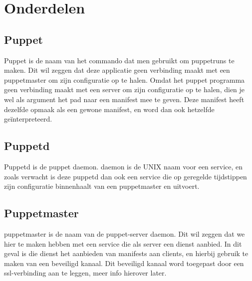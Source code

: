 \section{Onderdelen}

\subsection{Puppet}
Puppet is de naam van het commando dat men gebruikt om puppetruns te maken. Dit wil zeggen dat deze applicatie geen verbinding maakt met een puppetmaster om zijn configuratie op te halen. Omdat het puppet programma geen verbinding maakt met een server om zijn configuratie op te halen, dien je wel als argument het pad naar een manifest mee te geven. Deze manifest heeft dezelfde opmaak als een gewone manifest, en word dan ook hetzelfde geïnterpreteerd.

\subsection{Puppetd}
Puppetd is de puppet daemon. daemon is de UNIX naam voor een service, en zoals verwacht is deze puppetd dan ook een service die op geregelde tijdstippen zijn configuratie binnenhaalt van een puppetmaster en uitvoert.

\subsection{Puppetmaster}
puppetmaster is de naam van de puppet-server daemon. Dit wil zeggen dat we hier te maken hebben met een service die als server een dienst aanbied. In dit geval is die dienst het aanbieden van manifests aan clients, en hierbij gebruik te maken van een beveiligd kanaal. Dit beveiligd kanaal word toegepast door een ssl-verbinding aan te leggen, meer info hierover later.

